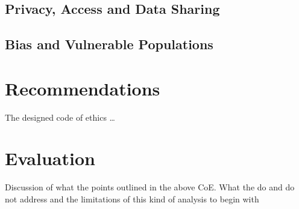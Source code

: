 \documentclass[11pt]{article}
\begin{document}
\subsection{Privacy, Access and Data Sharing}

\subsection{Bias and Vulnerable Populations}
\cite{nature_bias}

\section{Recommendations}
The designed code of ethics
\dots

\section{Evaluation}
Discussion of what the points outlined in the above CoE. What the do and do not address and the limitations of this kind of analysis to begin with


\newpage


\end{document}
